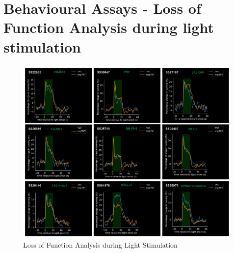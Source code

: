 \section{Behavioural Assays - Loss of Function Analysis during light stimulation}
    \begin{figure}
        \centering
        \includegraphics[width=12cm]{Figs/CX/BehaviourAssays.pdf}
        \caption[Loss of Function Analysis during Light Stimulation]{Loss of Function Analysis during Light Stimulation}
        \label{fig:label}
    \end{figure}


